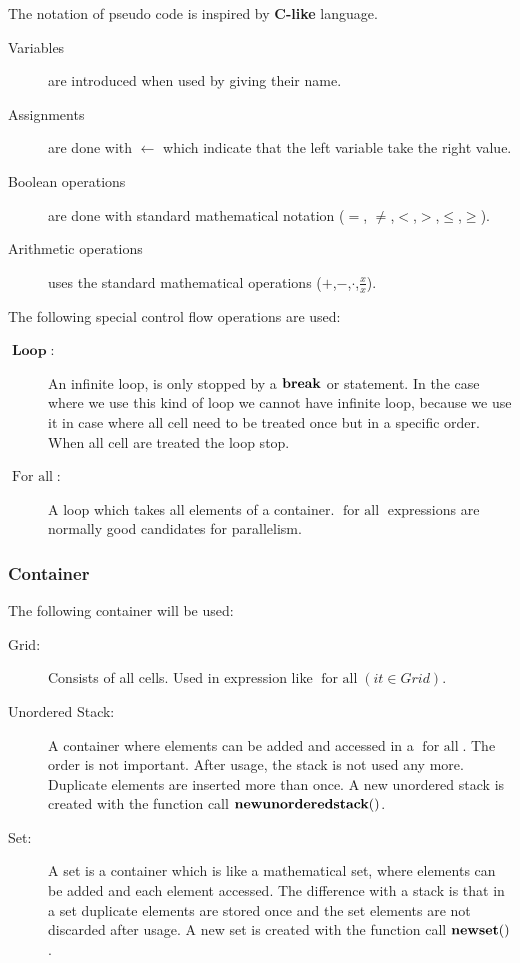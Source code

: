 The notation of pseudo code is inspired by \textbf{C-like} language.

\begin{description}
 \item[Variables] are introduced when used by giving their name.
\item[Assignments] are done with $\gets$ which indicate that the left variable take the right value.
\item[Boolean operations] are done with standard mathematical notation ($=$, $\neq$,$<$,$>$,$\leq$,$\geq$).
\item[Arithmetic operations] uses the standard mathematical operations ($+$,$-$,$\cdot$,$\frac{x}{x}$).
\end{description}

The following special control flow operations are used:
\begin{description}
 \item[$\mathop{\textbf{Loop}}$:] An infinite loop, is only stopped by a $\mathop{\textbf{break}}$ or \Return statement.
 In the case where we use this kind of loop we cannot have infinite loop, because we use it in case where 
 all cell need to be treated once but in a specific order. When all cell are treated the loop stop.
 \item[$\mathop{\textbf{For all}}$:] A loop which takes all elements of a container.
 $\mathop{\textbf{for all}}$ expressions are normally good candidates for parallelism.
\end{description}

\subsubsection{Container}

The following container will be used:
\begin{description}
 \item[Grid:] Consists of all cells. Used in expression like $\mathop{\textbf{for all}}(it \in Grid)$.
 \item[Unordered Stack:] A container where elements can be added and accessed in a $\mathop{\textbf{for all}}$. The order is not important.
 After usage, the stack is not used any more. Duplicate elements are inserted more than once.
 A new unordered stack is created with the function call $\mathop{\textbf{newunorderedstack}}()$.
 \item[Set:] A set is a container which is like a mathematical set, where elements can be added and each element accessed.
 The difference with a stack is that in a set duplicate elements are stored once and the set elements are not discarded after usage.
 A new set is created with the function call $\mathop{\textbf{newset}}()$.
\end{description}


